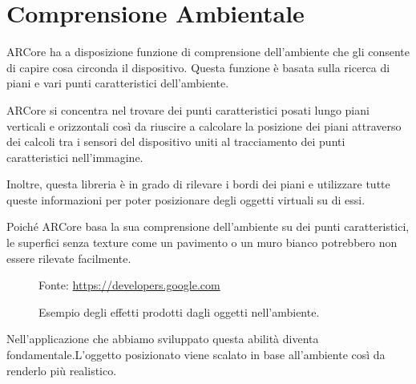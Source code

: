 \documentclass[crop=false, class=book]{standalone}
\begin{document}
	\section{Comprensione Ambientale}
	ARCore ha a disposizione funzione di comprensione dell’ambiente che gli consente di capire cosa circonda il dispositivo. Questa funzione è basata sulla ricerca di piani e vari punti caratteristici dell’ambiente.
	
	ARCore si concentra nel trovare dei punti caratteristici posati lungo piani verticali e orizzontali così da riuscire a calcolare la posizione dei piani attraverso dei calcoli tra i sensori del dispositivo uniti al tracciamento dei punti caratteristici nell’immagine. 
	
	Inoltre, questa libreria è in grado di rilevare i bordi dei piani e utilizzare tutte queste informazioni per poter posizionare degli oggetti virtuali su di essi.
	
	Poiché ARCore basa la sua comprensione dell’ambiente su dei punti caratteristici, le superfici senza texture come un pavimento o un muro bianco potrebbero non essere rilevate facilmente.

	\begin{center}
		\begin{figure}
			\centering
			{Fonte: \url{https://developers.google.com}}
			\caption{Esempio degli effetti prodotti dagli oggetti nell'ambiente.}
			\label{fig:env_und}
		\end{figure}
	\end{center}
	
	Nell'applicazione che abbiamo sviluppato questa abilità diventa fondamentale.L'oggetto posizionato viene scalato in base all'ambiente così da renderlo più realistico.
	
\end{document}
